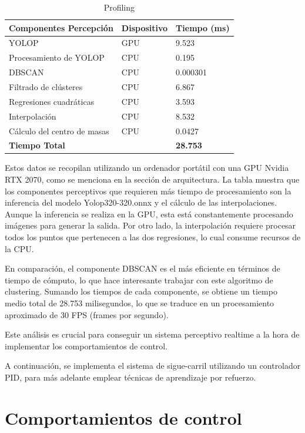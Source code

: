 \begin{table}[h]
    \centering
    \begin{tabular}{| m{5cm} | m{3cm} | m{3cm} |}
        \hline
        \textbf{Componentes Percepción} & \textbf{Dispositivo} & \textbf{Tiempo (ms)} \\ \hline
        YOLOP & GPU & 9.523 \\ \hline
        Procesamiento de YOLOP & CPU & 0.195 \\ \hline
        DBSCAN & CPU & 0.000301 \\ \hline
        Filtrado de clústeres & CPU & 6.867 \\ \hline
        Regresiones cuadráticas & CPU & 3.593 \\ \hline
        Interpolación & CPU & 8.532 \\ \hline
        Cálculo del centro de masas & CPU & 0.0427 \\ \hline
        \textbf{Tiempo Total} & & \textbf{28.753} \\ \hline
    \end{tabular}
    \caption{Profiling}
    \label{tab:Profiling}
\end{table}

Estos datos se recopilan utilizando un ordenador portátil con una GPU Nvidia RTX 2070, como se menciona en la sección de arquitectura. La tabla muestra que los 
componentes perceptivos que requieren más tiempo de procesamiento son la inferencia del modelo Yolop320-320.onnx y el cálculo de las interpolaciones. 
Aunque la inferencia se realiza en la GPU, esta está constantemente procesando imágenes para generar la salida. Por otro lado, la interpolación 
requiere procesar todos los puntos que pertenecen a las dos regresiones, lo cual consume recursos de la CPU.

En comparación, el componente DBSCAN es el más eficiente en términos de tiempo de cómputo, lo que hace interesante trabajar con este algoritmo de clustering. 
Sumando los tiempos de cada componente, se obtiene un tiempo medio total de 28.753 milisegundos, lo que se traduce en un procesamiento aproximado de 30 FPS (frames por segundo). 

Este análisis es crucial para conseguir un sistema perceptivo realtime a la hora de implementar los comportamientos de control. 

A continuación, se implementa el sistema de sigue-carril utilizando un controlador PID, para más adelante emplear técnicas de aprendizaje por refuerzo.
  \section{Comportamientos de control}
  \label{sec:Control}

